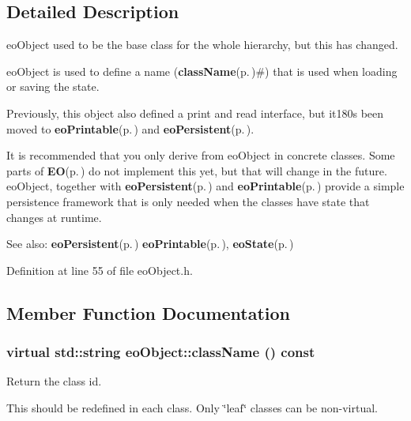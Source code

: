 \subsection{Detailed Description}
eo\-Object used to be the base class for the whole hierarchy, but this has changed. 

eo\-Object is used to define a name ({\bf class\-Name}{\rm (p.\,\pageref{classeo_object_a1})}\#) that is used when loading or saving the state.

Previously, this object also defined a print and read interface, but it180s been moved to {\bf eo\-Printable}{\rm (p.\,\pageref{classeo_printable})} and {\bf eo\-Persistent}{\rm (p.\,\pageref{classeo_persistent})}.

It is recommended that you only derive from eo\-Object in concrete classes. Some parts of {\bf EO}{\rm (p.\,\pageref{class_e_o})} do not implement this yet, but that will change in the future. eo\-Object, together with {\bf eo\-Persistent}{\rm (p.\,\pageref{classeo_persistent})} and {\bf eo\-Printable}{\rm (p.\,\pageref{classeo_printable})} provide a simple persistence framework that is only needed when the classes have state that changes at runtime.

\begin{Desc}
\item[See also:]{\bf eo\-Persistent}{\rm (p.\,\pageref{classeo_persistent})} {\bf eo\-Printable}{\rm (p.\,\pageref{classeo_printable})}, {\bf eo\-State}{\rm (p.\,\pageref{classeo_state})} \end{Desc}




Definition at line 55 of file eo\-Object.h.

\subsection{Member Function Documentation}
\subsubsection{\setlength{\rightskip}{0pt plus 5cm}virtual std::string eo\-Object::class\-Name () const\hspace{0.3cm}{\tt  [pure virtual]}}\label{classeo_object_a1}


Return the class id. 

This should be redefined in each class. Only \char`\"{}leaf\char`\"{} classes can be non-virtual.

